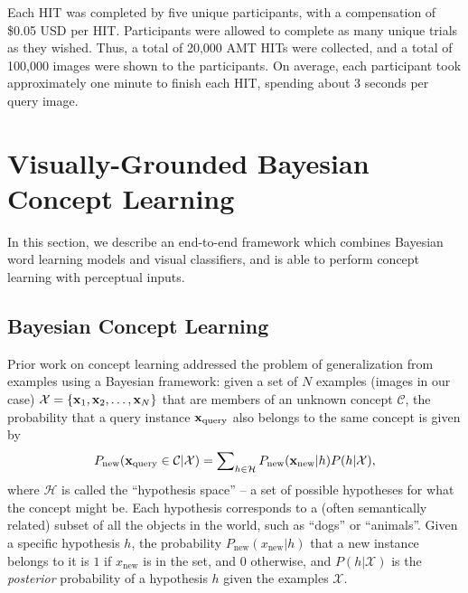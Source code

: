 Each HIT was completed by five unique participants, with a compensation of \$0.05 USD per HIT. Participants were allowed to complete as many unique trials as they wished. Thus, a total of 20,000 AMT HITs were collected, and a total of 100,000 images were shown to the participants. On average, each participant took approximately one minute to finish each HIT, spending about 3 seconds per query image.


\section{Visually-Grounded Bayesian Concept Learning}

In this section, we describe an end-to-end framework which combines Bayesian word learning models and visual classifiers, and is able to perform concept learning with perceptual inputs. 

\subsection{Bayesian Concept Learning}
Prior work on concept learning \cite{xu2007word} addressed the problem of generalization from examples using a Bayesian framework: given a set of $N$ examples (images in our case) $\mathcal{X} = \{ \mathbf{x}_1, \mathbf{x}_2,\ldots, \mathbf{x}_N \}$ that are members of an unknown concept $\mathcal{C}$, the probability that a query instance $\mathbf{x}_\mathrm{query}$ also belongs to the same concept is given by
\begin{equation}
P_{\mathrm{new}}(\mathbf{x}_\mathrm{query} \in \mathcal{C}|\mathcal{X}) = \sum\nolimits_{h \in \mathcal{H}} P_{\mathrm{new}}(\mathbf{x}_\mathrm{new} | h)P(h|\mathcal{X}), \label{eq:bayeswl}
\end{equation}
where $\mathcal{H}$ is called the ``hypothesis space'' -- a set of possible hypotheses for what the concept might be. Each hypothesis corresponds to a (often semantically related) subset of all the objects in the world, such as ``dogs'' or ``animals''. Given a specific hypothesis $h$, the probability $P_{\mathrm{new}}(x_\mathrm{new}|h)$ that a new instance belongs to it is $1$ if $x_\mathrm{new}$ is in the set, and $0$ otherwise, and $P(h | \mathcal{X})$ is the \emph{posterior} probability of a hypothesis $h$ given the examples $\mathcal{X}$.

